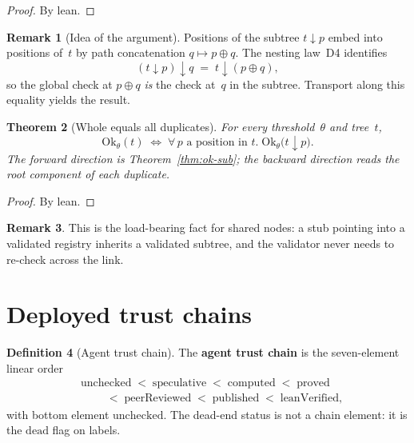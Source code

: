 \documentclass[11pt,a4paper]{article}
\theoremstyle{plain}
\newtheorem{theorem}{Theorem}[section]
\theoremstyle{definition}
\newtheorem{definition}[theorem]{Definition}
\newtheorem{remark}[theorem]{Remark}
\newcommand{\Ok}{\mathrm{Ok}}
\begin{document}
\begin{proof}
By lean.
\end{proof}

\begin{remark}[Idea of the argument]
Positions of the subtree $t \mathbin{\downarrow} p$ embed into positions
of~$t$ by path concatenation $q \mapsto p \oplus q$. The nesting law~D4
identifies
\[
  (t \mathbin{\downarrow} p) \mathbin{\downarrow} q
  \;=\;
  t \mathbin{\downarrow} (p \oplus q),
\]
so the global check at $p \oplus q$ \emph{is} the check at~$q$ in the
subtree. Transport along this equality yields the result.
\end{remark}

\begin{theorem}[Whole equals all duplicates]\label{thm:ok-iff}
For every threshold~$\theta$ and tree~$t$,
\begin{equation}
  \Ok_\theta(t)
  \;\Longleftrightarrow\;
  \forall\, p \text{ a position in } t.\;
  \Ok_\theta\bigl(t \mathbin{\downarrow} p\bigr).
\end{equation}
The forward direction is Theorem~\ref{thm:ok-sub}; the backward direction
reads the root component of each duplicate.
\end{theorem}

\begin{proof}
By lean.
\end{proof}

\begin{remark}
This is the load-bearing fact for shared nodes: a stub pointing into a
validated registry inherits a validated subtree, and the validator never
needs to re-check across the link.
\end{remark}

\section{Deployed trust chains}

\begin{definition}[Agent trust chain]\label{def:trustlevel}
The \textbf{agent trust chain} is the seven-element linear order
\begin{align*}
  &\mathrm{unchecked}
  \;<\; \mathrm{speculative}
  \;<\; \mathrm{computed}
  \;<\; \mathrm{proved} \\
  &\qquad
  \;<\; \mathrm{peerReviewed}
  \;<\; \mathrm{published}
  \;<\; \mathrm{leanVerified},
\end{align*}
with bottom element $\mathrm{unchecked}$. The dead-end status is not a
chain element: it is the $\mathrm{dead}$ flag on labels.
\end{definition}
\end{document}
